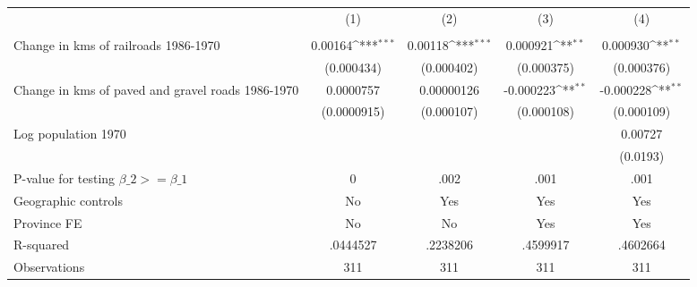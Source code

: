 {
\def\sym#1{\ifmmode^{#1}\else\(^{#1}\)\fi}
\begin{tabular}{l*{4}{c}}
\hline\hline
                &\multicolumn{1}{c}{(1)}&\multicolumn{1}{c}{(2)}&\multicolumn{1}{c}{(3)}&\multicolumn{1}{c}{(4)}\\
                &\multicolumn{1}{c}{}&\multicolumn{1}{c}{}&\multicolumn{1}{c}{}&\multicolumn{1}{c}{}\\
\hline
Change in kms of railroads 1986-1970&  0.00164\sym{***}&  0.00118\sym{***}& 0.000921\sym{**} & 0.000930\sym{**} \\
                &(0.000434)         &(0.000402)         &(0.000375)         &(0.000376)         \\
[1em]
Change in kms of paved and gravel roads 1986-1970&0.0000757         &0.00000126         &-0.000223\sym{**} &-0.000228\sym{**} \\
                &(0.0000915)         &(0.000107)         &(0.000108)         &(0.000109)         \\
[1em]
Log population 1970&                  &                  &                  &  0.00727         \\
                &                  &                  &                  & (0.0193)         \\
\hline
P-value for testing $\beta\_{2} >= \beta\_{1}$&        0         &     .002         &     .001         &     .001         \\
Geographic controls&       No         &      Yes         &      Yes         &      Yes         \\
Province FE     &       No         &       No         &      Yes         &      Yes         \\
R-squared       & .0444527         & .2238206         & .4599917         & .4602664         \\
Observations    &      311         &      311         &      311         &      311         \\
\hline\hline
\end{tabular}
}
